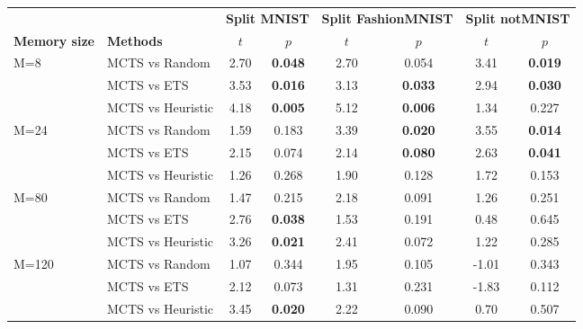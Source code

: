\begin{tabular}{llcccccc}
\toprule
                       &                  & \multicolumn{2}{c}{\textbf{Split MNIST}} & \multicolumn{2}{c}{\textbf{Split FashionMNIST}} & \multicolumn{2}{c}{\textbf{Split notMNIST}} \\
\cmidrule(lr){3-4} \cmidrule(lr){5-6} \cmidrule(lr){7-8}
\textbf{Memory size}   & \textbf{Methods} & $t$                & $p$                   & $t$                    & $p$                      & $t$                  & $p$                    \\
\midrule
\multirow{3}{*}{M=8}   & MCTS vs Random  & 2.70   & \textbf{0.048}  & 2.70       & 0.054              & 3.41     & \textbf{0.019}   \\
                       & MCTS vs ETS     & 3.53   & \textbf{0.016}  & 3.13       & \textbf{0.033}     & 2.94     & \textbf{0.030}   \\
                       & MCTS vs Heuristic & 4.18   & \textbf{0.005}  & 5.12       & \textbf{0.006}     & 1.34     & 0.227            \\
\midrule
\multirow{3}{*}{M=24}  & MCTS vs Random  & 1.59   & 0.183           & 3.39       & \textbf{0.020}     & 3.55     & \textbf{0.014}   \\
                       & MCTS vs ETS     & 2.15   & 0.074           & 2.14       & \textbf{0.080}     & 2.63     & \textbf{0.041}   \\
                       & MCTS vs Heuristic & 1.26   & 0.268           & 1.90       & 0.128              & 1.72     & 0.153            \\
\midrule
\multirow{3}{*}{M=80}  & MCTS vs Random  & 1.47   & 0.215           & 2.18       & 0.091              & 1.26     & 0.251            \\
                       & MCTS vs ETS     & 2.76   & \textbf{0.038}  & 1.53       & 0.191              & 0.48     & 0.645            \\
                       & MCTS vs Heuristic & 3.26   & \textbf{0.021}  & 2.41       & 0.072              & 1.22     & 0.285            \\
\midrule
\multirow{3}{*}{M=120} & MCTS vs Random  & 1.07   & 0.344           & 1.95       & 0.105              & -1.01    & 0.343            \\
                       & MCTS vs ETS     & 2.12   & 0.073           & 1.31       & 0.231              & -1.83    & 0.112            \\
                       & MCTS vs Heuristic & 3.45   & \textbf{0.020}  & 2.22       & 0.090              & 0.70     & 0.507            \\

\end{tabular}

